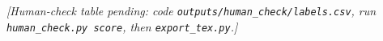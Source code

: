 \noindent\emph{[Human-check table pending: code \texttt{outputs/human\_check/labels.csv}, run \texttt{human\_check.py score}, then \texttt{export\_tex.py}.]}
